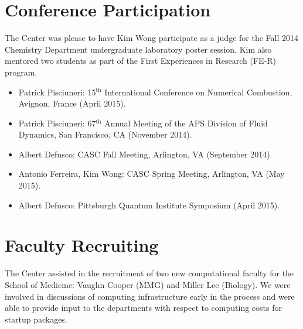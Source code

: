 \section{Conference Participation}
The Center was please to have Kim Wong participate as a judge for the Fall 2014
Chemistry Department undergraduate laboratory poster session.  Kim also mentored
two students as part of the First Experiences in Research (FE-R) program.

\begin{itemize}
    \item Patrick Pisciuneri: 15$^\text{th}$ International Conference on Numerical Combustion, Avignon, France (April 2015).
    \item Patrick Pisciuneri: 67$^\text{th}$ Annual Meeting of the APS Division of Fluid Dynamics, San Francisco, CA (November 2014).
    \item Albert Defusco: CASC Fall Meeting, Arlington, VA (September 2014).
    \item Antonio Ferreira, Kim Wong: CASC Spring Meeting, Arlington, VA (May 2015).
    \item Albert Defusco: Pittsburgh Quantum Institute Symposium (April 2015).
\end{itemize}

\section{Faculty Recruiting}
The Center assisted in the recruitment of two new computational faculty
for the School of Medicine: Vaughn Cooper (MMG) and Miller Lee (Biology).
We were involved in discussions of computing infrastructure early in the 
process and were able to provide input to the departments with respect to
computing costs for startup packages.